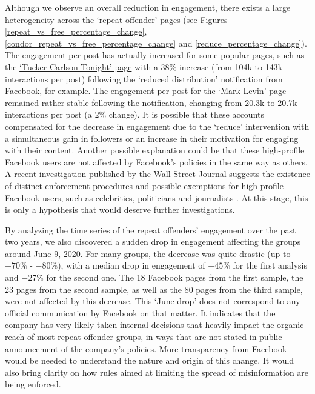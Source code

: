 \documentclass[review]{elsarticle}
\begin{document}
{{Although we observe an overall reduction in engagement, there exists a large heterogeneity across the `repeat offender' pages (see Figures \ref{repeat_vs_free_percentage_change}, \ref{condor_repeat_vs_free_percentage_change} and \ref{reduce_percentage_change}). 
The engagement per post has actually increased for some popular pages, such as the \href{https://www.facebook.com/TuckerCarlsonTonight/}{`Tucker Carlson Tonight' page} with a $38\%$ increase (from 104k to 143k interactions per post) following the `reduced distribution' notification from Facebook, for example.
The engagement per post for the \href{https://www.facebook.com/marklevinshow}{`Mark Levin' page} remained rather stable following the notification, changing from 20.3k to 20.7k interactions per post (a $2\%$ change).
It is possible that these accounts compensated for the decrease in engagement due to the `reduce' intervention with a simultaneous gain in followers or an increase in their motivation for engaging with their content.
Another possible explanation could be that these high-profile Facebook users are not affected by Facebook's policies in the same way as others. 
A recent investigation published by the Wall Street Journal suggests the existence of distinct enforcement procedures and possible exemptions for high-profile Facebook users, such as celebrities, politicians and journalists \citep{WSJrevelations}. 
At this stage, this is only a hypothesis that would deserve further investigations.

By analyzing the time series of the repeat offenders’ engagement over the past two years, we also discovered a sudden drop in engagement affecting the groups around June 9, 2020.
For many groups, the decrease was quite drastic (up to $-70\%$ - $-80\%$), with a median drop in engagement of $-45\%$ for the first analysis and $-27\%$ for the second one.
The 18 Facebook pages from the first sample, the 23 pages from the second sample, as well as the 80 pages from the third sample, were not affected by this decrease.
This `June drop' does not correspond to any official communication by Facebook on that matter. 
It indicates that the company has very likely taken internal decisions that heavily impact the organic reach of most repeat offender groups, in ways that are not stated in public announcement of the company's policies.
More transparency from Facebook would be needed to understand the nature and origin of this change. 
It would also bring clarity on how rules aimed at limiting the spread of misinformation are being enforced.

}}
\end{document}

